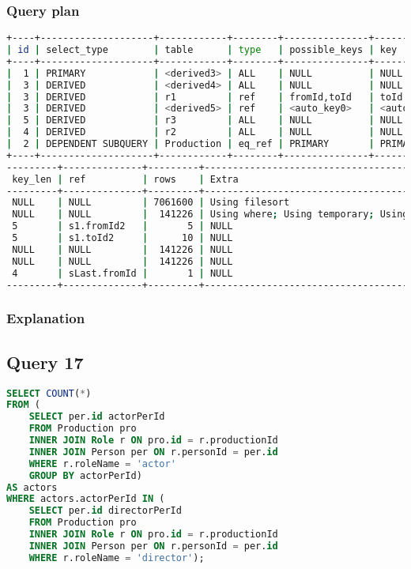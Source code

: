 \subsubsection{Query plan}
\begin{lstlisting}[language=bash]
+----+--------------------+------------+--------+---------------+-------------+
| id | select_type        | table      | type   | possible_keys | key         |
+----+--------------------+------------+--------+---------------+-------------+
|  1 | PRIMARY            | <derived3> | ALL    | NULL          | NULL        |
|  3 | DERIVED            | <derived4> | ALL    | NULL          | NULL        |
|  3 | DERIVED            | r1         | ref    | fromId,toId   | toId        |
|  3 | DERIVED            | <derived5> | ref    | <auto_key0>   | <auto_key0> |
|  5 | DERIVED            | r3         | ALL    | NULL          | NULL        |
|  4 | DERIVED            | r2         | ALL    | NULL          | NULL        |
|  2 | DEPENDENT SUBQUERY | Production | eq_ref | PRIMARY       | PRIMARY     |
+----+--------------------+------------+--------+---------------+-------------+
---------+--------------+---------+----------------------------------------------+
 key_len | ref          | rows    | Extra                                        |
---------+--------------+---------+----------------------------------------------+
 NULL    | NULL         | 7061600 | Using filesort                               |
 NULL    | NULL         |  141226 | Using where; Using temporary; Using filesort |
 5       | s1.fromId2   |       5 | NULL                                         |
 5       | s1.toId2     |      10 | NULL                                         |
 NULL    | NULL         |  141226 | NULL                                         |
 NULL    | NULL         |  141226 | NULL                                         |
 4       | sLast.fromId |       1 | NULL                                         |
---------+--------------+---------+----------------------------------------------+
\end{lstlisting}

\subsubsection{Explanation}


\subsection{Query 17}
\begin{lstlisting}[language=sql]
SELECT COUNT(*)
FROM (
	SELECT per.id actorPerId
	FROM Production pro
	INNER JOIN Role r ON pro.id = r.productionId
	INNER JOIN Person per ON r.personId = per.id
	WHERE r.roleName = 'actor'
	GROUP BY actorPerId)
AS actors
WHERE actors.actorPerId IN (
	SELECT per.id directorPerId
	FROM Production pro
	INNER JOIN Role r ON pro.id = r.productionId
	INNER JOIN Person per ON r.personId = per.id
	WHERE r.roleName = 'director');
\end{lstlisting}

